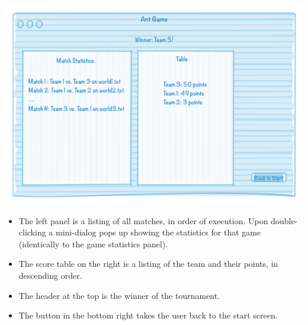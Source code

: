 \documentclass[11pt]{article}
\begin{document}
\begin{center}
\includegraphics[width=\textwidth]{low-level-diagrams/interface/tournament-statistics-screen}
\end{center}

\begin{itemize}
\item The left panel is a listing of all matches, in order of execution. Upon double-clicking a mini-dialog pops up showing the statistics for that game (identically to the game statistics panel).
\item The score table on the right is a listing of the team and their points, in descending order.
\item The header at the top is the winner of the tournament.
\item The button in the bottom right takes the user back to the start screen.
\end{itemize}
\end{document}
